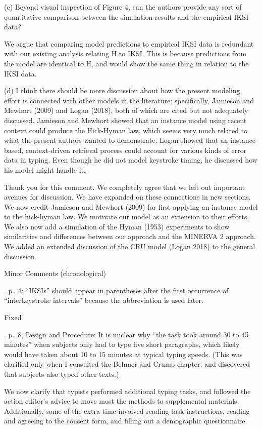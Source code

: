 \documentclass[draft]{article}
\begin{document}
\RC (c) Beyond visual inspection of Figure 4, can the authors provide any sort of quantitative comparison between the simulation results and the empirical IKSI data?

We argue that comparing model predictions to empirical IKSI data is redundant with our existing analysis relating H to IKSI. This is because predictions from the model are identical to H, and would show the same thing in relation to the IKSI data.

\RC (d) I think there should be more discussion about how the present modeling effort is connected with other models in the literature; specifically, Jamieson and Mewhort (2009) and Logan (2018), both of which are cited but not adequately discussed. Jamieson and Mewhort showed that an instance model using recent context could produce the Hick-Hyman law, which seems very much related to what the present authors wanted to demonstrate. Logan showed that an instance-based, context-driven retrieval process could account for various kinds of error data in typing. Even though he did not model keystroke timing, he discussed how his model might handle it.

Thank you for this comment. We completely agree that we left out important avenues for discussion. We have expanded on these connections in new sections. We now credit Jamieson and Mewhort (2009) for first applying an instance model to the hick-hyman law. We motivate our model as an extension to their efforts. We also now add a simulation of the Hyman (1953) experiments to show similarities and differences between our approach and the MINERVA 2 approach. We added an extended discussion of the CRU model (Logan 2018) to the general discussion.

Minor Comments (chronological)

. p.~4: ``IKSIs'' should appear in parentheses after the first occurrence of ``interkeystroke intervals'' because the abbreviation is used later.

Fixed

. p.~8, Design and Procedure: It is unclear why ``the task took around 30 to 45 minutes'' when subjects only had to type five short paragraphs, which likely would have taken about 10 to 15 minutes at typical typing speeds. (This was clarified only when I consulted the Behmer and Crump chapter, and discovered that subjects also typed other texts.)

We now clarify that typists performed additional typing tasks, and followed the action editor's advice to move most the methods to supplemental materials. Additionally, some of the extra time involved reading task instructions, reading and agreeing to the consent form, and filling out a demographic questionnaire.
\end{document}
